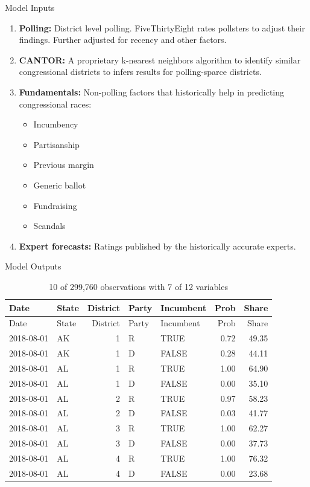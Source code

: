 \documentclass[ignorenonframetext,]{beamer}
\providecommand{\tightlist}{%
  \setlength{\itemsep}{0pt}\setlength{\parskip}{0pt}}
\begin{document}
\begin{frame}{Model Inputs}
\protect\hypertarget{model-inputs}{}

\begin{enumerate}
\tightlist
\item
  \textbf{Polling:} District level polling. FiveThirtyEight rates
  pollsters to adjust their findings. Further adjusted for recency and
  other factors.
\item
  \textbf{CANTOR:} A proprietary k-nearest neighbors algorithm to
  identify similar congressional districts to infers results for
  polling-sparce districts.
\item
  \textbf{Fundamentals:} Non-polling factors that historically help in
  predicting congressional races:

  \begin{itemize}
  \tightlist
  \item
    Incumbency
  \item
    Partisanship
  \item
    Previous margin
  \item
    Generic ballot
  \item
    Fundraising
  \item
    Scandals
  \end{itemize}
\item
  \textbf{Expert forecasts:} Ratings published by the historically
  accurate experts.
\end{enumerate}

\end{frame}

\begin{frame}{Model Outputs}
\protect\hypertarget{model-outputs}{}

\begin{longtable}[]{@{}llrllrr@{}}
\caption{10 of 299,760 observations with 7 of 12
variables}\tabularnewline
\toprule
Date & State & District & Party & Incumbent & Prob &
Share\tabularnewline
\midrule
\endfirsthead
\toprule
Date & State & District & Party & Incumbent & Prob &
Share\tabularnewline
\midrule
\endhead
2018-08-01 & AK & 1 & R & TRUE & 0.72 & 49.35\tabularnewline
2018-08-01 & AK & 1 & D & FALSE & 0.28 & 44.11\tabularnewline
2018-08-01 & AL & 1 & R & TRUE & 1.00 & 64.90\tabularnewline
2018-08-01 & AL & 1 & D & FALSE & 0.00 & 35.10\tabularnewline
2018-08-01 & AL & 2 & R & TRUE & 0.97 & 58.23\tabularnewline
2018-08-01 & AL & 2 & D & FALSE & 0.03 & 41.77\tabularnewline
2018-08-01 & AL & 3 & R & TRUE & 1.00 & 62.27\tabularnewline
2018-08-01 & AL & 3 & D & FALSE & 0.00 & 37.73\tabularnewline
2018-08-01 & AL & 4 & R & TRUE & 1.00 & 76.32\tabularnewline
2018-08-01 & AL & 4 & D & FALSE & 0.00 & 23.68\tabularnewline
\bottomrule
\end{longtable}

\end{frame}
\end{document}
